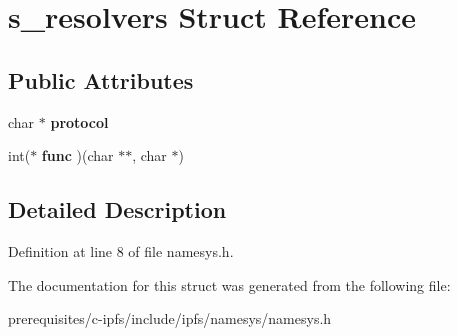 \hypertarget{structs__resolvers}{}\section{s\+\_\+resolvers Struct Reference}
\label{structs__resolvers}
\subsection*{Public Attributes}
\begin{DoxyCompactItemize}
\item 
\mbox{\label{structs__resolvers_a65205ab5b26c0affb1f500192ca90dcb}} 
char $\ast$ {\bfseries protocol}
\item 
\mbox{\label{structs__resolvers_a35b5feb27aac5fc6371981100a8c0e06}} 
int($\ast$ {\bfseries func} )(char $\ast$$\ast$, char $\ast$)
\end{DoxyCompactItemize}


\subsection{Detailed Description}


Definition at line 8 of file namesys.\+h.



The documentation for this struct was generated from the following file\+:\begin{DoxyCompactItemize}
\item 
prerequisites/c-\/ipfs/include/ipfs/namesys/namesys.\+h\end{DoxyCompactItemize}

